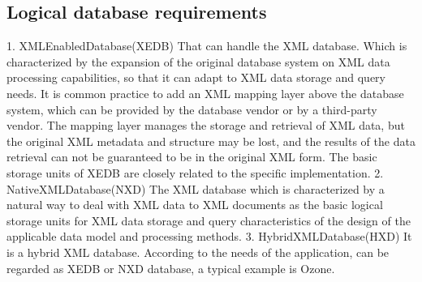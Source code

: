 %

\subsection{Logical database requirements}

1. XMLEnabledDatabase(XEDB)
That can handle the XML database. Which is characterized by the expansion of the original database system on XML data processing capabilities, so that it can adapt to XML data storage and query needs. It is common practice to add an XML mapping layer above the database system, which can be provided by the database vendor or by a third-party vendor. The mapping layer manages the storage and retrieval of XML data, but the original XML metadata and structure may be lost, and the results of the data retrieval can not be guaranteed to be in the original XML form. The basic storage units of XEDB are closely related to the specific implementation.
2. NativeXMLDatabase(NXD)
The XML database which is characterized by a natural way to deal with XML data to XML documents as the basic logical storage units for XML data storage and query characteristics of the design of the applicable data model and processing methods.
3. HybridXMLDatabase(HXD)
It is a hybrid XML database. According to the needs of the application, can be regarded as XEDB or NXD database, a typical example is Ozone.


